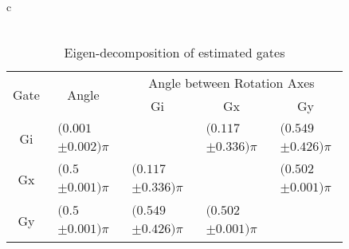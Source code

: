 \documentclass{beamer}
\begin{document}
\begin{frame}
\begin{table}[h]
\begin{center}
{\begin{tabular}{c}
\\
\vspace{2em}
\\
\begin{tabular}[l]{|c|c|c|c|c|}
\hline
\multirow{2}{*}{Gate} & \multirow{2}{*}{Angle} & \multicolumn{3}{c|}{Angle between Rotation Axes} \\ \cline{3-5}
 & & Gi & Gx & Gy \\ \hline
Gi & $ \begin{array}{c}(0.001 \\ \pm 0.002)\pi \end{array} $ &  & $ \begin{array}{c}(0.117 \\ \pm 0.336)\pi \end{array} $ & $ \begin{array}{c}(0.549 \\ \pm 0.426)\pi \end{array} $ \\ \hline
Gx & $ \begin{array}{c}(0.5 \\ \pm 0.001)\pi \end{array} $ & $ \begin{array}{c}(0.117 \\ \pm 0.336)\pi \end{array} $ &  & $ \begin{array}{c}(0.502 \\ \pm 0.001)\pi \end{array} $ \\ \hline
Gy & $ \begin{array}{c}(0.5 \\ \pm 0.001)\pi \end{array} $ & $ \begin{array}{c}(0.549 \\ \pm 0.426)\pi \end{array} $ & $ \begin{array}{c}(0.502 \\ \pm 0.001)\pi \end{array} $ &  \\ \hline
\end{tabular}

\end{tabular}
}
\caption{Eigen-decomposition of estimated gates}
\end{center}
\end{table}

\end{frame}
\end{document}
